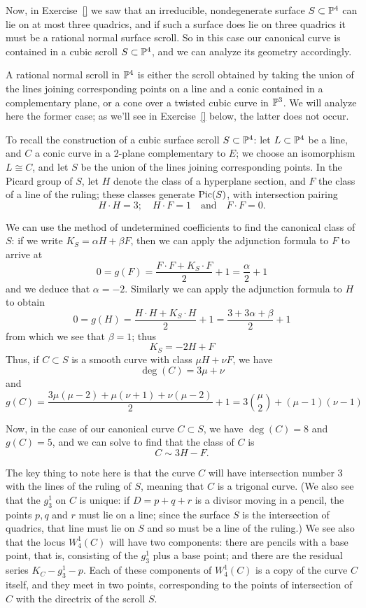 Now, in Exercise~\ref{} we saw that an irreducible, nondegenerate surface $S \subset \PP^4$ can lie on at most three quadrics, and if such a surface does lie on three quadrics it must be a rational normal surface scroll. So in this case our canonical curve is contained in a cubic scroll $S \subset \PP^4$, and we can analyze its geometry accordingly.

A rational normal scroll in $\PP^4$ is either the scroll obtained by taking the union of the lines joining corresponding points on a line and a conic contained in a complementary plane, or a cone over a twisted cubic curve in $\PP^3$. We will analyze here the former case; as we'll see in Exercise~\ref{} below, the latter does not occur.

To recall the construction of a cubic surface scroll $S \subset \PP^4$: let $L \subset \PP^4$ be a line, and $C$ a conic curve in a 2-plane complementary to $E$; we choose an isomorphism $L \cong C$, and let $S$ be the union of the lines joining corresponding points. In the Picard group of $S$, let $H$ denote the class of a hyperplane section, and $F$ the class of a line of the ruling; these classes generate $\pic(S)$, with intersection pairing
$$
H\cdot H = 3; \quad H\cdot F = 1 \quad \text{and} \quad F\cdot F= 0.
$$

We can use the method of undetermined coefficients to find the canonical class of $S$: if we write $K_S = \alpha H + \beta F$, then we can apply the adjunction formula to $F$ to arrive at
$$
0 = g(F) = \frac{F\cdot F + K_S\cdot F}{2} + 1 = \frac{\alpha}{2} + 1
$$
and we deduce that $\alpha = -2$. Similarly we can apply the adjunction formula to $H$ to obtain
$$
0 = g(H) = \frac{H\cdot H + K_S\cdot H}{2} + 1 = \frac{3 + 3\alpha + \beta}{2} + 1
$$
from which we see that $\beta = 1$; thus 
$$
K_S = -2H + F
$$
Thus, if $C \subset S$ is a smooth curve with class $\mu H + \nu F$, we have
$$
\deg(C) = 3\mu + \nu
$$
and
$$ 
g(C) = \frac{3\mu(\mu-2) + \mu(\nu + 1) + \nu(\mu - 2)}{2} + 1   = 3\binom{\mu}{2} + (\mu - 1)(\nu - 1)
$$

Now, in the case of our canonical curve $C \subset S$, we have $\deg(C) = 8$ and $g(C) = 5$, and we can solve to find that the class of $C$ is
$$
C \sim 3H - F.
$$

The key thing to note here is that the curve $C$ will have intersection number 3 with the lines of the ruling of $S$, meaning that $C$ is a trigonal curve. (We also see that the $g^1_3$ on $C$ is unique: if $D = p + q + r$ is a divisor moving in a pencil, the points $p, q$ and $r$ must lie on a line; since the surface $S$ is the intersection of quadrics, that line must lie on $S$ and so must be a line of the ruling.) We see also that the locus $W^1_4(C)$ will have two components: there are pencils with a base point, that is, consisting of the $g^1_3$ plus a base point; and there are the residual series $K_C - g^1_3 - p$. Each of these components of $W^1_4(C)$ is a copy of the curve $C$ itself, and they meet in two points, corresponding to the points of intersection of $C$ with the directrix of the scroll $S$.

